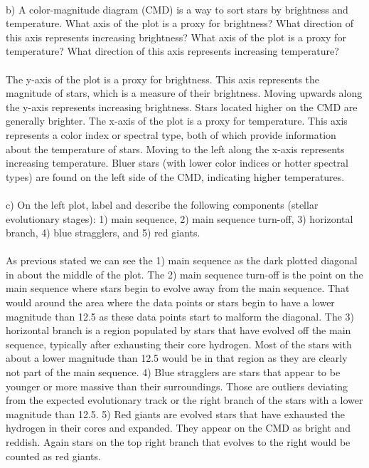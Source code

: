 \\
b) A color-magnitude diagram (CMD) is a way to sort stars by brightness and temperature. What axis of the
plot is a proxy for brightness? What direction of this axis represents increasing brightness? What axis
of the plot is a proxy for temperature? What direction of this axis represents increasing temperature?\\
\\
The y-axis of the plot is a proxy for brightness. This axis represents the magnitude of stars, which is 
a measure of their brightness. Moving upwards along the y-axis represents increasing brightness. Stars 
located higher on the CMD are generally brighter. The x-axis of the plot is a proxy for temperature. This 
axis represents a color index or spectral type, both of which provide information about the temperature 
of stars. Moving to the left along the x-axis represents increasing temperature. Bluer stars (with lower 
color indices or hotter spectral types) are found on the left side of the CMD, indicating higher 
temperatures.\\
\\
c) On the left plot, label and describe the following components (stellar evolutionary stages): 1) main
sequence, 2) main sequence turn-off, 3) horizontal branch, 4) blue stragglers, and 5) red giants.\\
\\
As previous stated we can see the 1) main sequence as the dark plotted diagonal in about the middle of 
the plot. The 2) main sequence turn-off is the point on the main sequence where stars begin to evolve away 
from the main sequence. That would around the area where the data points or stars begin to have a lower 
magnitude than 12.5 as these data points start to malform the diagonal. The 3) horizontal branch is a 
region populated by stars that have evolved off the main sequence, typically after exhausting their core 
hydrogen. Most of the stars with about a lower magnitude than 12.5 would be in that region as they are 
clearly not part of the main sequence. 4) Blue stragglers are stars that appear to be younger or more 
massive than their surroundings. Those are outliers deviating from the expected evolutionary track or the
right branch of the stars with a lower magnitude than 12.5. 5) Red giants are evolved stars that have 
exhausted the hydrogen in their cores and expanded. They appear on the CMD as bright and reddish. Again
stars on the top right branch that evolves to the right would be counted as red giants.\\
